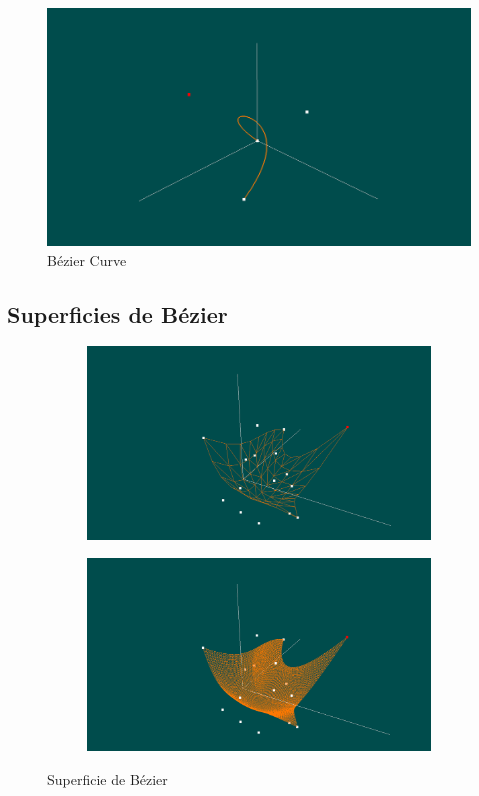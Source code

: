 \begin{figure}
	\centering
	\includegraphics[width=\textwidth]{figures/mybeziercurve.png}
	\caption{Bézier Curve}
	\label{fig:mybeziercurve}
\end{figure}

\subsection{Superficies de Bézier}
\label{makereference5.5.3}

\begin{figure}
	\centering		
	\begin{subfigure}{\textwidth}
		\includegraphics[width=\textwidth]{figures/mybeziersurface1.png}
	\end{subfigure}
	\newline
	\begin{subfigure}{\textwidth}
		\includegraphics[width=\textwidth]{figures/mybeziersurface2.png}
	\end{subfigure}
	\caption{Superficie de Bézier}
	\label{fig:mybeziersurface}
\end{figure}

